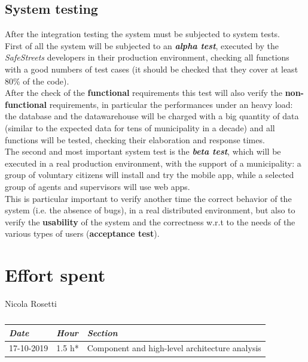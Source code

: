 \documentclass[a4paper]{report}
\begin{document}
\section{System testing}
After the integration testing the system must be subjected to system tests.\\
First of all the system will be subjected to an \textit{\textbf{alpha test}}, executed by the \textit{SafeStreets} developers in their production environment, checking all functions with a good numbers of test cases (it should be checked that they cover at least 80\% of the code).\\
After the check of the \textbf{functional} requirements this test will also verify the \textbf{non-functional} requirements, in particular the performances under an heavy load: the database and the datawarehouse will be charged with a big quantity of data (similar to the expected data for tens of municipality in a decade) and all functions will be tested, checking their elaboration and response times.\\
The second and most important system test is the \textit{\textbf{beta test}}, which will be executed in a real production environment, with the support of a municipality: a group of voluntary citizens will install and try the mobile app, while a selected group of agents and supervisors will use web apps.\\
This is particular important to verify another time the correct behavior of the system (i.e. the absence of bugs), in a real distributed environment, but also to verify the \textbf{usability} of the system and the correctness w.r.t to the needs of the various types of users (\textbf{acceptance test}).


\chapter{Effort spent}

\begin{table}[H]
\centering
Nicola Rosetti \\
\begin{tabular}{p{2cm}p{1.5cm}p{7cm}}
\toprule
\textit{Date} & \textit{Hour} & \textit{Section} \\ \midrule
17-10-2019 & 1.5 h* & Component and high-level architecture analysis \\ \midrule
\bottomrule
\end{tabular}
\caption[Nicola Rosetti's effort table]{}
\end{table}
\end{document}
